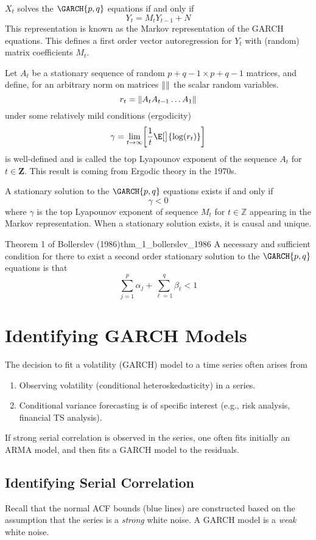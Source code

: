 \begin{Theorem}{}{}
    $X_{t}$ solves the $ \GARCH{p,q} $ equations if and only if
    \[
        Y_{t}=M_{t} Y_{t-1}+N
    \]
    This representation is known as the Markov representation of the GARCH equations.
    This defines a first order vector autoregression for $Y_{t}$ with
    (random) matrix coefficients $M_{t}$.
\end{Theorem}
Let $A_{t}$ be a stationary sequence of random $p+q-1 \times p+q-1$ matrices, and define,
for an arbitrary norm on matrices $\lVert\rVert$ the scalar random variables.
\[ r_{t}=\lVert A_{t} A_{t-1} \ldots A_{1}\rVert \]
under some relatively mild conditions (ergodicity)
\[ \gamma=\lim\limits_{{t} \to {\infty}}\biggl[\frac{1}{t} \E[\big]{\log(r_{t})}\biggr] \]
is well-defined and is called the top Lyapounov exponent of the sequence
$A_{t}$ for $t \in \mathbf{Z}$.
This result is coming from Ergodic theory in the 1970s.
\begin{Theorem}{}{}
    A stationary solution to the $ \GARCH{p,q} $ equations exists if and only if
    \[ \gamma<0 \]
    where $\gamma$ is the top Lyapounov exponent of sequence
    $M_{t}$ for $t \in \mathbb{Z}$ appearing in the Markov representation.
    When a stationary solution exists, it is causal and unique.
\end{Theorem}
\begin{Theorem}{Theorem 1 of Bollerslev (1986)}{thm_1_bollerslev_1986}
    A necessary and sufficient condition for there to exist a second order stationary
    solution to the $ \GARCH{p,q} $ equations is that
    \[ \sum_{j=1}^{p} \alpha_{j}+\sum_{\ell=1}^{q} \beta_{\ell}<1 \]
\end{Theorem}

\section{Identifying GARCH Models}
The decision to fit a volatility (GARCH) model to a time series often
arises from
\begin{enumerate}[(1)]
    \item Observing volatility (conditional heteroskedasticity)
          in a series.
    \item Conditional variance forecasting is of specific interest
          (e.g., risk analysis, financial TS analysis).
\end{enumerate}
If strong serial correlation is observed in the series, one
often fits initially an ARMA model, and then
fits a GARCH model to the residuals.
\subsection*{Identifying Serial Correlation}
Recall that the normal ACF bounds (blue lines)
are constructed based on the assumption that
the series is a \emph{strong} white noise. A GARCH
model is a \emph{weak} white noise.

